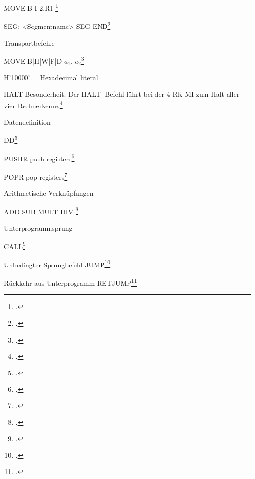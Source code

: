 \documentclass{lehramt-informatik-haupt}
\begin{document}
MOVE B I 2,R1
\footcite[Seite 24]{borghoff}

SEG: <Segmentname> SEG END\footcite[Seite 22]{borghoff}

Transportbefehle

MOVE B|H|W|F|D $a_1$, $a_2$\footcite[Seite 26]{borghoff}

H'10000' = Hexadecimal literal

HALT
Besonderheit: Der HALT -Befehl führt bei der 4-RK-MI zum Halt aller vier Rechnerkerne.\footcite[Seite 32]{borghoff}

Datendefinition

DD\footcite[Seite 36]{borghoff}

PUSHR push registers\footcite[Seite 26]{borghoff}

POPR pop registers\footcite[Seite 26]{borghoff}

Arithmetische Verknüpfungen

ADD
SUB
MULT
DIV \footcite[Seite 27]{borghoff}

Unterprogrammsprung

CALL\footcite[Seite 28]{borghoff}

Unbedingter Sprungbefehl
JUMP\footcite[Seite 28]{borghoff}

Rückkehr aus Unterprogramm
RETJUMP\footcite[Seite 29]{borghoff}

\literatur
\end{document}
